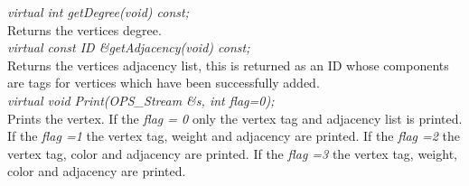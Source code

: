 {\em virtual int getDegree(void) const;} \\
Returns the vertices degree. \\

{\em virtual const ID \&getAdjacency(void) const;} \\
Returns the vertices adjacency list, this is returned as an ID whose
components are tags for vertices which have been successfully added.\\
    
{\em virtual void Print(OPS_Stream \&s, int flag=0);} \\
Prints the vertex. If the {\em flag = 0} only the vertex tag and
adjacency list is printed. If the {\em flag =1} the vertex tag, weight
and adjacency are printed. If the {\em flag =2} the vertex tag, color
and adjacency are printed. If the {\em flag =3} the vertex tag,
weight, color and adjacency are printed. \\  






